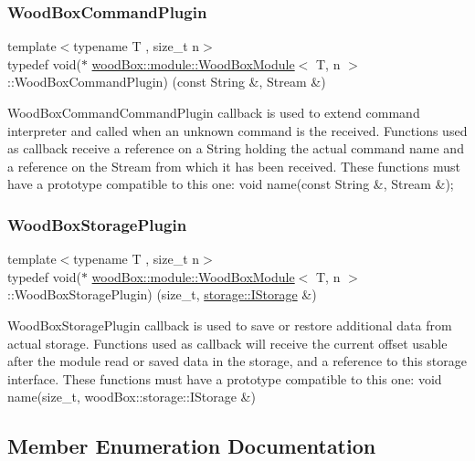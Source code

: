 \subsubsection{\texorpdfstring{Wood\+Box\+Command\+Plugin}{WoodBoxCommandPlugin}}
{\footnotesize\ttfamily template$<$typename T , size\+\_\+t n$>$ \\
typedef void($\ast$ \mbox{\hyperlink{classwood_box_1_1module_1_1_wood_box_module}{wood\+Box\+::module\+::\+Wood\+Box\+Module}}$<$ T, n $>$\+::Wood\+Box\+Command\+Plugin) (const String \&, Stream \&)}

Wood\+Box\+Command\+Command\+Plugin callback is used to extend command interpreter and called when an unknown command is the received. Functions used as callback receive a reference on a String holding the actual command name and a reference on the Stream from which it has been received. These functions must have a prototype compatible to this one\+: void name(const String \&, Stream \&); \mbox{\label{classwood_box_1_1module_1_1_wood_box_module_ac7fea0a06e9fcab2ffb63500f6cd6565}} 
\subsubsection{\texorpdfstring{Wood\+Box\+Storage\+Plugin}{WoodBoxStoragePlugin}}
{\footnotesize\ttfamily template$<$typename T , size\+\_\+t n$>$ \\
typedef void($\ast$ \mbox{\hyperlink{classwood_box_1_1module_1_1_wood_box_module}{wood\+Box\+::module\+::\+Wood\+Box\+Module}}$<$ T, n $>$\+::Wood\+Box\+Storage\+Plugin) (size\+\_\+t, \mbox{\hyperlink{classwood_box_1_1storage_1_1_i_storage}{storage\+::\+I\+Storage}} \&)}

Wood\+Box\+Storage\+Plugin callback is used to save or restore additional data from actual storage. Functions used as callback will receive the current offset usable after the module read or saved data in the storage, and a reference to this storage interface. These functions must have a prototype compatible to this one\+: void name(size\+\_\+t, wood\+Box\+::storage\+::\+I\+Storage \&) 

\subsection{Member Enumeration Documentation}
\mbox{\label{classwood_box_1_1module_1_1_wood_box_module_af74476c8a785de7fe587c4fb68435673}} 
